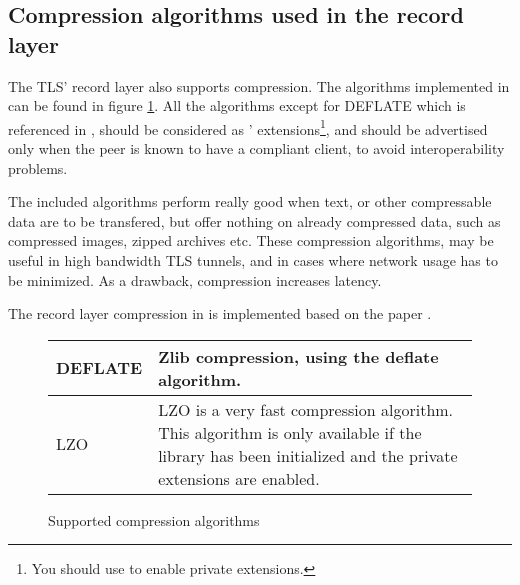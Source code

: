 \subsection*{Compression algorithms used in the record layer}
The TLS' record layer also supports compression. The algorithms
implemented in \gnutls{} can be found in figure \ref{fig:compression}.
All the algorithms except for DEFLATE which is referenced in \cite{TLSCOMP}, should be 
considered as \gnutls' extensions\footnote{You should use 
to enable private extensions.}, and
should be advertised only when the peer is known to have a compliant client,
to avoid interoperability problems.
\par
The included algorithms perform really good when text, or other
compressable data are to be transfered, but offer nothing on already 
compressed data, such as compressed images, zipped archives etc.
These compression algorithms, may be useful in high bandwidth TLS tunnels,
and in cases where network usage has to be minimized. As a drawback, 
compression increases latency.

\par
The record layer compression in \gnutls{} is implemented based on
the paper \cite{TLSCOMP}.

\begin{figure}[hbtp]
\begin{tabular}{|l|p{9cm}|}

\hline
DEFLATE & Zlib compression, using the deflate algorithm.
\\
\hline
LZO & LZO is a very fast compression algorithm. This algorithm is only
available if the \gnutlse{} library has been initialized and the
private extensions are enabled.
\\
\hline
\end{tabular}
\caption{Supported compression algorithms}
\label{fig:compression}
\end{figure}


